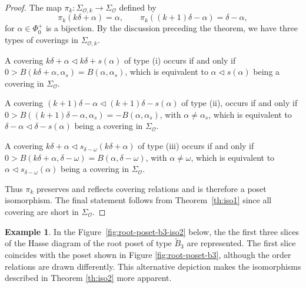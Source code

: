 \documentclass{amsart}
\theoremstyle{definition}
\newtheorem{Example}[Theorem]{Example}
\newcommand{\mo}{\mathcal{O}}
\begin{document}
\begin{proof}
The map $\pi_k : \Sigma_{\mo,k} \longrightarrow \Sigma_{\mo}$ defined by
\[
\pi_k(k\delta+\alpha)=\alpha,
\qquad
\pi_k((k+1)\delta-\alpha)=\delta-\alpha,
\]
for $\alpha\in\Phi_0^+$ is a bijection. By the discussion preceding the theorem, we have three types of coverings in $\Sigma_{\mo,k}$.
\smallskip

A covering $k\delta+\alpha \lhd k\delta+s(\alpha)$ of type (i) occurs if and only if
$0>B(k\delta+\alpha,\alpha_s)=B(\alpha,\alpha_s)$,
which is equivalent to $\alpha \lhd s(\alpha)$ being a covering in $\Sigma_{\mo}$. 
\smallskip

A covering $(k+1)\delta-\alpha \lhd (k+1)\delta-s(\alpha)$ of type (ii), occurs if and only if
$ 0>B((k+1)\delta-\alpha,\alpha_s)=-B(\alpha,\alpha_s)$,
with $\alpha\neq\alpha_s$, which is equivalent to
$\delta-\alpha \lhd \delta-s(\alpha)$
being a covering in $\Sigma_{\mo}$.
\smallskip

A covering $k\delta+\alpha \lhd s_{\delta-\omega}(k\delta+\alpha)$ of type (iii)
occurs if and only if $0>B(k\delta+\alpha,\delta-\omega)=B(\alpha,\delta-\omega)$, with $\alpha\neq\omega$, which is equivalent to $\alpha \lhd s_{\delta-\omega}(\alpha)
$ being a covering in $\Sigma_{\mo}$. 
\smallskip

Thus $\pi_k$ preserves and reflects covering relations and is therefore a poset isomorphism. The final statement follows from Theorem~\ref{th:iso1} since all covering are short in $\Sigma_\mo$.
\end{proof}

\begin{Example} In the Figure~\ref{fig:root-poset-b3-iso2} below, the the first three slices of the Hasse diagram of the root poset of type $\widetilde{B}_3$ are represented. The first slice coincides with the poset shown in Figure \ref{fig:root-poset-b3}, although the order relations are drawn differently. This alternative depiction makes the isomorphisms described in Theorem \ref{th:iso2} more apparent.
\end{Example}
\end{document}
